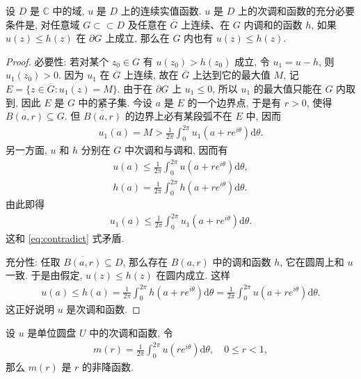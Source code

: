 \documentclass[../../main.tex]{subfiles}%
\begin{document}
\begin{theorem}
\label{theorem:max_principle}
设 \(D\) 是 \(\mathbb{C}\) 中的域, \(u\) 是 \(D\) 上的连续实值函数. \(u\) 是 \(D\) 上的次调和函数的充分必要条件是, 对任意域 \(G \subset\subset D\) 及任意在 \(\overline{G}\) 上连续、在 \(G\) 内调和的函数 \(h\), 如果 \(u(z) \leqslant h(z)\) 在 \(\partial G\) 上成立, 那么在 \(G\) 内也有 \(u(z) \leqslant h(z)\).
\end{theorem}
\begin{proof}

{\heiti 必要性:} 若对某个 \(z_0 \in G\) 有 \(u(z_0) > h(z_0)\) 成立, 令 \(u_1 = u - h\), 则 \(u_1(z_0) > 0\). 因为 \(u_1\) 在 \(\overline{G}\) 上连续, 故在 \(\overline{G}\) 上达到它的最大值 \(M\), 记 \(E = \{ z \in \overline{G} : u_1(z) = M \}\). 由于在 \(\partial G\) 上 \(u_1 \leqslant 0\), 所以 \(u_1\) 的最大值只能在 \(G\) 内取到, 因此 \(E\) 是 \(G\) 中的紧子集. 今设 \(a\) 是 \(E\) 的一个边界点, 于是有 \(r>0\), 使得 \(\overline{B(a,r)} \subseteq G\). 但 \(\overline{B(a,r)}\) 的边界上必有某段弧不在 \(E\) 中, 因而
\begin{align}
u_1(a) = M > \frac{1}{2\pi} \int_{0}^{2\pi} u_1(a+re^{i\theta}) \mathrm{d}\theta.
\label{eq:contradict}
\end{align}
另一方面, \(u\) 和 \(h\) 分别在 \(G\) 中次调和与调和, 因而有
\begin{align*}
u(a) \leqslant \frac{1}{2\pi} \int_{0}^{2\pi} u(a+re^{i\theta}) \mathrm{d}\theta, \\
h(a) = \frac{1}{2\pi} \int_{0}^{2\pi} h(a+re^{i\theta}) \mathrm{d}\theta.
\end{align*}
由此即得
\begin{align*}
u_1(a) \leqslant \frac{1}{2\pi} \int_{0}^{2\pi} u_1(a+re^{i\theta}) \mathrm{d}\theta.
\end{align*}
这和 \eqref{eq:contradict} 式矛盾.

{\heiti 充分性:} 任取 \(\overline{B(a,r)} \subseteq D\), 那么存在 \(B(a,r)\) 中的调和函数 \(h\), 它在圆周上和 \(u\) 一致. 于是由假定, \(u(z) \leqslant h(z)\) 在圆内成立. 这样
\begin{align*}
u(a) \leqslant h(a) = \frac{1}{2\pi} \int_{0}^{2\pi} h(a+re^{i\theta}) \mathrm{d}\theta = \frac{1}{2\pi} \int_{0}^{2\pi} u(a+re^{i\theta}) \mathrm{d}\theta.
\end{align*}
这正好说明 \(u\) 是次调和函数.
\end{proof}

\begin{theorem}
\label{theorem:mean_monotonicity}
设 \(u\) 是单位圆盘 \(U\) 中的次调和函数, 令
\begin{align*}
m(r) = \frac{1}{2\pi} \int_{0}^{2\pi} u(re^{i\theta}) \mathrm{d}\theta, \quad 0 \leqslant r < 1,
\end{align*}
那么 \(m(r)\) 是 \(r\) 的非降函数.
\end{theorem}
\end{document}
